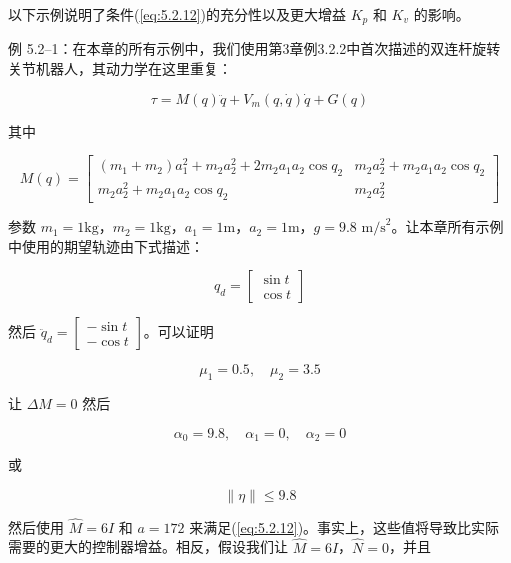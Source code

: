 \documentclass[UTF8,12pt,a4paper]{ctexart}
\begin{document}
以下示例说明了条件(\ref{eq:5.2.12})的充分性以及更大增益 $K_p$ 和 $K_v$ 的影响。

\begin{example}
例 5.2--1：在本章的所有示例中，我们使用第3章例3.2.2中首次描述的双连杆旋转关节机器人，其动力学在这里重复：

\begin{equation}
\tau = M(q)\ddot{q} + V_m(q, \dot{q})\dot{q} + G(q)
\end{equation}

其中

\begin{equation}
M(q) = \begin{bmatrix}
(m_1 + m_2)a_1^2 + m_2 a_2^2 + 2m_2 a_1 a_2 \cos q_2 & m_2 a_2^2 + m_2 a_1 a_2 \cos q_2 \\
m_2 a_2^2 + m_2 a_1 a_2 \cos q_2 & m_2 a_2^2
\end{bmatrix}
\end{equation}

参数 $m_1 = 1\text{kg}$，$m_2 = 1\text{kg}$，$a_1 = 1\text{m}$，$a_2 = 1\text{m}$，$g = 9.8\text{ m/s}^2$。让本章所有示例中使用的期望轨迹由下式描述：

\begin{equation}
q_d = \begin{bmatrix} \sin t \\ \cos t \end{bmatrix}
\end{equation}

然后 $\ddot{q}_d = \begin{bmatrix} -\sin t \\ -\cos t \end{bmatrix}$。可以证明

\begin{equation}
\mu_1 = 0.5, \quad \mu_2 = 3.5
\end{equation}

让 $\Delta M = 0$ 然后

\begin{equation}
\alpha_0 = 9.8, \quad \alpha_1 = 0, \quad \alpha_2 = 0
\end{equation}

或

\begin{equation}
\|\eta\| \leq 9.8
\end{equation}

然后使用 $\hat{M} = 6I$ 和 $a = 172$ 来满足(\ref{eq:5.2.12})。事实上，这些值将导致比实际需要的更大的控制器增益。相反，假设我们让 $\hat{M} = 6I$，$\hat{N} = 0$，并且


\end{example}
\end{document}
